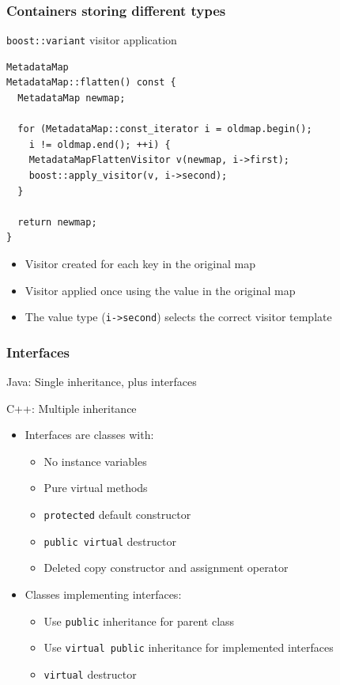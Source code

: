\documentclass[handout]{beamer}
\begin{document}
\begin{frame}[fragile]
  \frametitle{Containers storing different types}
  \begin{block}{\texttt{boost::variant} visitor application}
    \scriptsize
    \begin{lstlisting}
MetadataMap
MetadataMap::flatten() const {
  MetadataMap newmap;

  for (MetadataMap::const_iterator i = oldmap.begin();
    i != oldmap.end(); ++i) {
    MetadataMapFlattenVisitor v(newmap, i->first);
    boost::apply_visitor(v, i->second);
  }

  return newmap;
}
\end{lstlisting}
  \begin{itemize}
    \pause
  \item Visitor created for each key in the original map
  \item Visitor applied once using the value in the original map
  \item The value type (\texttt{i->second}) selects the correct visitor template
  \end{itemize}
  \end{block}
\end{frame}


\begin{frame}[fragile]
  \frametitle{Interfaces}
\begin{block}{Java: Single inheritance, plus interfaces}
\end{block}
\begin{block}{C++: Multiple inheritance}
  \begin{itemize}
    \pause
  \item Interfaces are classes with:
    \begin{itemize}
      \item No instance variables
      \item Pure virtual methods
      \item \texttt{protected} default constructor
      \item \texttt{public virtual} destructor
      \item Deleted copy constructor and assignment operator
    \end{itemize}
    \pause
  \item Classes implementing interfaces:
    \begin{itemize}
      \item Use \texttt{public} inheritance for parent class
      \item Use \texttt{virtual public} inheritance for implemented interfaces
      \item \texttt{virtual} destructor
    \end{itemize}
  \end{itemize}
\end{block}
\end{frame}
\end{document}

